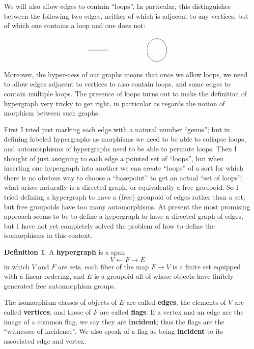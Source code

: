 \documentclass{article}
\theoremstyle{definition}
\newtheorem{defn}[thm]{Definition}
\theoremstyle{remark}
\let\ot\leftarrow
\begin{document}
We will also allow edges to contain ``loops''.
In particular, this distinguishes between the following two edges, neither of which is adjacent to any vertices, but of which one contains a loop and one does not:
\[
\begin{tikzpicture}
  \draw (0,0) -- (1,0);
  \draw (3,0) to[out=90,in=90,looseness=2] (4,0) to[out=-90,in=-90,looseness=2] (3,0);
\end{tikzpicture}
\]
Moreover, the hyper-ness of our graphs means that once we allow loops, we need to allow edges adjacent to vertices to also contain loops, and some edges to contain multiple loops.
The presence of loops turns out to make the definition of hypergraph very tricky to get right, in particular as regards the notion of morphism between such graphs.

First I tried just marking each edge with a natural number ``genus''; but in defining labeled hypergraphs as morphisms we need to be able to collapse loops, and automorphisms of hypergraphs need to be able to permute loops.
Then I thought of just assigning to each edge a pointed set of ``loops'', but when inserting one hypergraph into another we can create ``loops'' of a sort for which there is no obvious way to choose a ``basepoint'' to get an actual ``set of loops''; what arises naturally is a directed graph, or equivalently a free groupoid.
So I tried defining a hypergraph to have a (free) groupoid of edges rather than a set; but free groupoids have too many automorphisms.
At present the most promising approach seems to be to define a hypergraph to have a directed graph of edges, but I have not yet completely solved the problem of how to define the isomorphisms in this context.

\begin{defn}
  A \textbf{hypergraph} is a span
  \[ V \ot F \to E \]
  in which $V$ and $F$ are sets, each fiber of the map $F\to V$ is a finite set equipped with a linear ordering, and $E$ is a groupoid all of whose objects have finitely generated free automorphism groups.

  The isomorphism classes of objects of $E$ are called \textbf{edges}, the elements of $V$ are called \textbf{vertices}, and those of $F$ are called \textbf{flags}.
  If a vertex and an edge are the image of a common flag, we say they are \textbf{incident}; thus the flags are the ``witnesses of incidence''.
  We also speak of a flag as being \textbf{incident} to its associated edge and vertex.
\end{defn}
\end{document}
